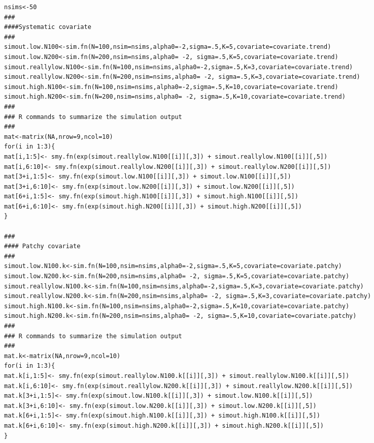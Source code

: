 \documentclass[12pt]{article}
\begin{document}
\begin{spacing}{1.2}
{\begin{verbatim}
nsims<-50
###
####Systematic covariate 
###
simout.low.N100<-sim.fn(N=100,nsim=nsims,alpha0=-2,sigma=.5,K=5,covariate=covariate.trend)
simout.low.N200<-sim.fn(N=200,nsim=nsims,alpha0= -2, sigma=.5,K=5,covariate=covariate.trend)
simout.reallylow.N100<-sim.fn(N=100,nsim=nsims,alpha0=-2,sigma=.5,K=3,covariate=covariate.trend)
simout.reallylow.N200<-sim.fn(N=200,nsim=nsims,alpha0= -2, sigma=.5,K=3,covariate=covariate.trend)
simout.high.N100<-sim.fn(N=100,nsim=nsims,alpha0=-2,sigma=.5,K=10,covariate=covariate.trend)
simout.high.N200<-sim.fn(N=200,nsim=nsims,alpha0= -2, sigma=.5,K=10,covariate=covariate.trend)
###
### R commands to summarize the simulation output
###
mat<-matrix(NA,nrow=9,ncol=10)
for(i in 1:3){
mat[i,1:5]<- smy.fn(exp(simout.reallylow.N100[[i]][,3]) + simout.reallylow.N100[[i]][,5])
mat[i,6:10]<- smy.fn(exp(simout.reallylow.N200[[i]][,3]) + simout.reallylow.N200[[i]][,5])
mat[3+i,1:5]<- smy.fn(exp(simout.low.N100[[i]][,3]) + simout.low.N100[[i]][,5])
mat[3+i,6:10]<- smy.fn(exp(simout.low.N200[[i]][,3]) + simout.low.N200[[i]][,5])
mat[6+i,1:5]<- smy.fn(exp(simout.high.N100[[i]][,3]) + simout.high.N100[[i]][,5])
mat[6+i,6:10]<- smy.fn(exp(simout.high.N200[[i]][,3]) + simout.high.N200[[i]][,5])
}

### 
#### Patchy covariate
###
simout.low.N100.k<-sim.fn(N=100,nsim=nsims,alpha0=-2,sigma=.5,K=5,covariate=covariate.patchy)
simout.low.N200.k<-sim.fn(N=200,nsim=nsims,alpha0= -2, sigma=.5,K=5,covariate=covariate.patchy)
simout.reallylow.N100.k<-sim.fn(N=100,nsim=nsims,alpha0=-2,sigma=.5,K=3,covariate=covariate.patchy)
simout.reallylow.N200.k<-sim.fn(N=200,nsim=nsims,alpha0= -2, sigma=.5,K=3,covariate=covariate.patchy)
simout.high.N100.k<-sim.fn(N=100,nsim=nsims,alpha0=-2,sigma=.5,K=10,covariate=covariate.patchy)
simout.high.N200.k<-sim.fn(N=200,nsim=nsims,alpha0= -2, sigma=.5,K=10,covariate=covariate.patchy)
###
### R commands to summarize the simulation output
###
mat.k<-matrix(NA,nrow=9,ncol=10)
for(i in 1:3){
mat.k[i,1:5]<- smy.fn(exp(simout.reallylow.N100.k[[i]][,3]) + simout.reallylow.N100.k[[i]][,5])
mat.k[i,6:10]<- smy.fn(exp(simout.reallylow.N200.k[[i]][,3]) + simout.reallylow.N200.k[[i]][,5])
mat.k[3+i,1:5]<- smy.fn(exp(simout.low.N100.k[[i]][,3]) + simout.low.N100.k[[i]][,5])
mat.k[3+i,6:10]<- smy.fn(exp(simout.low.N200.k[[i]][,3]) + simout.low.N200.k[[i]][,5])
mat.k[6+i,1:5]<- smy.fn(exp(simout.high.N100.k[[i]][,3]) + simout.high.N100.k[[i]][,5])
mat.k[6+i,6:10]<- smy.fn(exp(simout.high.N200.k[[i]][,3]) + simout.high.N200.k[[i]][,5])
}



\end{verbatim}
}





\newpage





\end{spacing}
\end{document}
